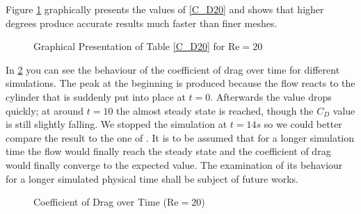 Figure \ref{fig:C_D20} graphically presents the values of \cref{C_D20} and shows that higher degrees produce accurate results much faster than finer meshes. \\\indent
	\begin{figure}[htp]	
		\centering
		\caption{Graphical Presentation of Table \ref{C_D20} for $\text{Re} = 20$}
		\label{fig:C_D20}	
	\end{figure}
	In \cref{fig:C_Dt} you can see the behaviour of the coefficient of drag over time for different simulations. The peak at the beginning is produced because the flow reacts to the cylinder that is suddenly put into place at $t=0$. Afterwards the value drops quickly; at around $t=10$ the almost steady state is reached, though the $C_D$ value is still slightly falling. We stopped the simulation at $t=14s$ so we could better compare the result to the one of \textcite{ayers}. It is to be assumed that for a longer simulation time the flow would finally reach the steady state and the coefficient of drag would finally converge to the expected value. The examination of its behaviour for a longer simulated physical time shall be subject of future works.\\\indent
\begin{figure}[htp]	
	\centering
	\caption{Coefficient of Drag over Time ($\text{Re} = 20$)}
	\label{fig:C_Dt}	
\end{figure}
